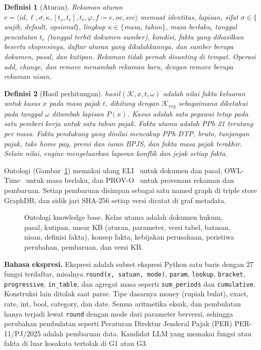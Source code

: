 \documentclass[conference]{IEEEtran}
\makeatletter
\DeclareRobustCommand{\en}[1]{{\usefont{\f@encoding}{\f@family}{\f@series}{it}#1\/}}
\newtheorem{definisi}{Definisi}
\newcommand{\K}{\mathcal{K}}
\newcommand{\hasil}{\mathit{hasil}}
\makeatother
\begin{document}
\begin{definisi}[Aturan]
\label{def:aturan}
Rekaman aturan $r = \langle \mathit{id}, \ell, \sigma, \kappa, [t_s, t_e], t_c, \varphi, f \coloneqq e, \mathit{ov}, \mathit{src} \rangle$ memuat identitas, lapisan, sifat $\sigma \in \{$wajib, \en{default}, opsional$\}$, lingkup $\kappa \in \{$masa, tahun$\}$, masa berlaku, tanggal pencatatan $t_c$ (tanggal terbit dokumen sumber), kondisi, fakta yang dihasilkan beserta ekspresinya, daftar aturan yang dikalahkannya, dan sumber berupa dokumen, pasal, dan kutipan. Rekaman tidak pernah disunting di tempat. Operasi \en{add}, \en{change}, dan \en{remove} menambah rekaman baru, dengan \en{remove} berupa rekaman nisan.
\end{definisi}

\begin{definisi}[Hasil perhitungan]
\label{def:hasil}
$\hasil(\K, x, t, \omega)$ adalah nilai fakta keluaran untuk kasus $x$ pada masa pajak $t$, dihitung dengan $\K_{\mathit{reg}}$ sebagaimana diketahui pada tanggal $\omega$ ditambah lapisan $P(x)$. Kasus adalah satu pegawai tetap pada satu pemberi kerja untuk satu tahun pajak. Fakta utama adalah PPh 21 terutang per masa. Fakta pendukung yang dinilai mencakup PPh DTP, bruto, tunjangan pajak, \en{take home pay}, premi dan iuran BPJS, dan fakta masa pajak terakhir. Selain nilai, \en{engine} mengeluarkan laporan konflik dan jejak setiap fakta.
\end{definisi}

Ontologi (Gambar~\ref{fig:ontologi}) memakai ulang ELI~\cite{publicationsoffice2026eli} untuk dokumen dan pasal, OWL-Time~\cite{cox2017owltime} untuk masa berlaku, dan PROV-O~\cite{lebo2013provo} untuk provenans rekaman dan pembaruan. Setiap pembaruan disimpan sebagai satu \en{named graph} di \en{triple store} GraphDB, dan sidik jari SHA-256 setiap versi dicatat di graf metadata.

\begin{figure}[t]
\centering

\caption{Ontologi \en{knowledge base}. Kelas utama adalah dokumen hukum, pasal, kutipan, unsur KB (aturan, parameter, versi tabel, batasan, nisan, definisi fakta), konsep fakta, kebijakan perusahaan, peristiwa perubahan, pembaruan, dan versi KB.}
\label{fig:ontologi}
\end{figure}

\textbf{Bahasa ekspresi.} Ekspresi adalah subset ekspresi Python satu baris dengan 27 fungsi terdaftar, misalnya \texttt{round(x, satuan, mode)}, \texttt{param}, \texttt{lookup}, \texttt{bracket}, \texttt{progressive}, \texttt{in\_table}, dan agregat masa seperti \texttt{sum\_periods} dan \texttt{cumulative}. Konstruksi lain ditolak saat \en{parse}. Tipe dasarnya \en{money} (rupiah bulat), \en{exact}, \en{rate}, \en{int}, \en{bool}, \en{category}, dan \en{date}. Semua aritmetika eksak, dan pembulatan hanya terjadi lewat \texttt{round} dengan mode dari parameter berversi, sehingga perubahan pembulatan seperti Peraturan Direktur Jenderal Pajak (PER) PER-11/PJ/2025 adalah pembaruan data. Kandidat LLM yang memakai fungsi atau fakta di luar kosakata tertolak di G1 atau G3.
\end{document}
